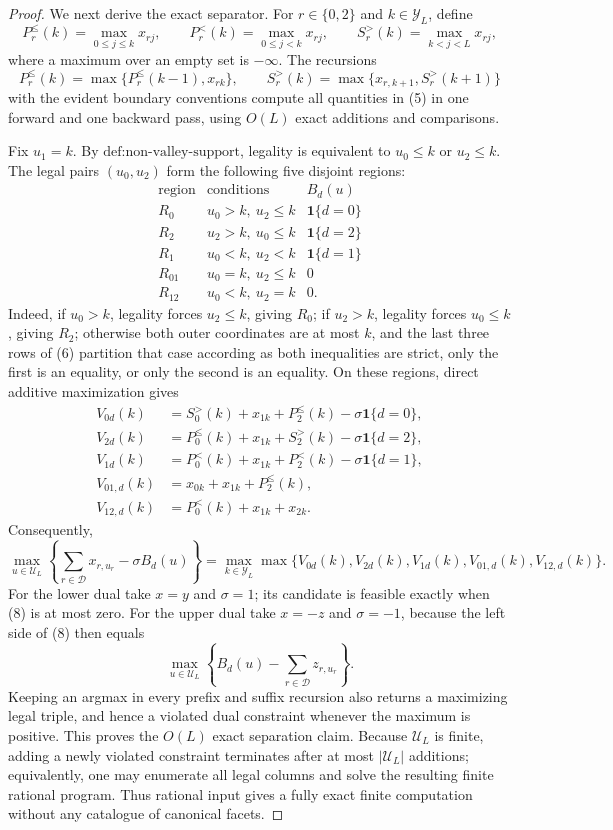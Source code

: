 \documentclass{article}
\begin{document}
\begin{proof}
We next derive the exact separator.  For \(r\in\{0,2\}\) and \(k\in\mathcal Y_L\), define
\[
 P_r^{\le}(k)=\max_{0\le j\le k}x_{rj},\qquad
 P_r^{<}(k)=\max_{0\le j<k}x_{rj},\qquad
 S_r^{>}(k)=\max_{k<j<L}x_{rj},
 \tag{5}
\]
where a maximum over an empty set is \(-\infty\).  The recursions
\[
 P_r^{\le}(k)=\max\{P_r^{\le}(k-1),x_{rk}\},
 \qquad
 S_r^{>}(k)=\max\{x_{r,k+1},S_r^{>}(k+1)\}
\]
with the evident boundary conventions compute all quantities in (5) in one forward and one backward pass, using \(O(L)\) exact additions and comparisons.

Fix \(u_1=k\).  By \(\text{def:non-valley-support}\), legality is equivalent to \(u_0\le k\) or \(u_2\le k\).  The legal pairs \((u_0,u_2)\) form the following five disjoint regions:
\[
\begin{array}{c|c|c}
\text{region}&\text{conditions}&B_d(u)\\ \hline
R_0&u_0>k,\ u_2\le k&\mathbf 1\{d=0\}\\
R_2&u_2>k,\ u_0\le k&\mathbf 1\{d=2\}\\
R_1&u_0<k,\ u_2<k&\mathbf 1\{d=1\}\\
R_{01}&u_0=k,\ u_2\le k&0\\
R_{12}&u_0<k,\ u_2=k&0.
\end{array}
 \tag{6}
\]
Indeed, if \(u_0>k\), legality forces \(u_2\le k\), giving \(R_0\); if \(u_2>k\), legality forces \(u_0\le k\), giving \(R_2\); otherwise both outer coordinates are at most \(k\), and the last three rows of (6) partition that case according as both inequalities are strict, only the first is an equality, or only the second is an equality.  On these regions, direct additive maximization gives
\[
\begin{aligned}
 V_{0d}(k)&=S_0^{>}(k)+x_{1k}+P_2^{\le}(k)-\sigma\mathbf 1\{d=0\},\\
 V_{2d}(k)&=P_0^{\le}(k)+x_{1k}+S_2^{>}(k)-\sigma\mathbf 1\{d=2\},\\
 V_{1d}(k)&=P_0^{<}(k)+x_{1k}+P_2^{<}(k)-\sigma\mathbf 1\{d=1\},\\
 V_{01,d}(k)&=x_{0k}+x_{1k}+P_2^{\le}(k),\\
 V_{12,d}(k)&=P_0^{<}(k)+x_{1k}+x_{2k}.
\end{aligned}
 \tag{7}
\]
Consequently,
\[
 \max_{u\in\mathcal U_L}
 \left\{\sum_{r\in\mathcal D}x_{r,u_r}-\sigma B_d(u)\right\}
 =\max_{k\in\mathcal Y_L}
 \max\{V_{0d}(k),V_{2d}(k),V_{1d}(k),V_{01,d}(k),V_{12,d}(k)\}.
 \tag{8}
\]
For the lower dual take \(x=y\) and \(\sigma=1\); its candidate is feasible exactly when (8) is at most zero.  For the upper dual take \(x=-z\) and \(\sigma=-1\), because the left side of (8) then equals
\[
 \max_{u\in\mathcal U_L}\left\{B_d(u)-\sum_{r\in\mathcal D}z_{r,u_r}\right\}.
\]
Keeping an argmax in every prefix and suffix recursion also returns a maximizing legal triple, and hence a violated dual constraint whenever the maximum is positive.  This proves the \(O(L)\) exact separation claim.  Because \(\mathcal U_L\) is finite, adding a newly violated constraint terminates after at most \(|\mathcal U_L|\) additions; equivalently, one may enumerate all legal columns and solve the resulting finite rational program.  Thus rational input gives a fully exact finite computation without any catalogue of canonical facets.


\end{proof}
\end{document}
